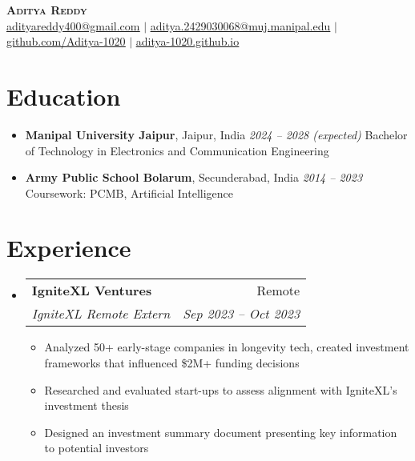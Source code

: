 \documentclass[letterpaper,11pt]{article}
\makeatletter
\newcommand{\resumeItem}[1]{
  \item\small{
    {#1 \vspace{-2pt}}
  }
}
\newcommand{\resumeSubheading}[4]{
  \vspace{-2pt}\item
    \begin{tabular*}{0.97\textwidth}[t]{l@{\extracolsep{\fill}}r}
      \textbf{#1} & #2 \\
      \textit{\small#3} & \textit{\small #4} \\
    \end{tabular*}\vspace{-7pt}
}
\newcommand{\resumeSubHeadingListStart}{\begin{itemize}[leftmargin=0.15in, label={}]}
\newcommand{\resumeSubHeadingListEnd}{\end{itemize}}
\newcommand{\resumeItemListStart}{\begin{itemize}}
\newcommand{\resumeItemListEnd}{\end{itemize}\vspace{-5pt}}
\makeatother
\begin{document}
\begin{center}
    \textbf{\Huge \scshape Aditya Reddy} \\ \vspace{1pt}
    \small \href{mailto:adityareddy400@gmail.com}{\underline{adityareddy400@gmail.com}} $|$ 
    \href{mailto:aditya.2429030068@muj.manipal.edu}{\underline{aditya.2429030068@muj.manipal.edu}} $|$
    \href{https://github.com/Aditya-1020}{\underline{github.com/Aditya-1020}} $|$
    \href{https://aditya-1020.github.io}{\underline{aditya-1020.github.io}}
\end{center}

\section{Education}
\begin{itemize}[leftmargin=*, itemsep=1pt]
  \item \textbf{Manipal University Jaipur}, Jaipur, India \hfill \textit{2024 -- 2028 (expected)}  
  \newline Bachelor of Technology in Electronics and Communication Engineering
  \item \textbf{Army Public School Bolarum}, Secunderabad, India \hfill \textit{2014 -- 2023}  
  \newline Coursework: PCMB, Artificial Intelligence
\end{itemize}

\section{Experience}
  \resumeSubHeadingListStart

    \resumeSubheading
      {IgniteXL Ventures}{Remote}
      {IgniteXL Remote Extern}{Sep 2023 -- Oct 2023}
      \resumeItemListStart
        \resumeItem{Analyzed 50+ early-stage companies in longevity tech, created investment frameworks that influenced \$2M+ funding decisions}
        \resumeItem{Researched and evaluated start-ups to assess alignment with IgniteXL’s investment thesis}
        \resumeItem{Designed an investment summary document presenting key information to potential investors}
      \resumeItemListEnd

  \resumeSubHeadingListEnd

\end{document}
